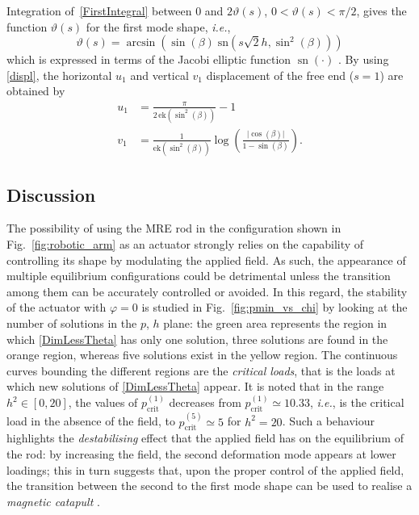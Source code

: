 \documentclass[oneside]{article}
\begin{document}
			Integration of~\eqref{FirstIntegral} between 0 and $2\vartheta(s)$, $0<\vartheta(s)<\pi/2$, gives the function $\vartheta(s)$ for the first mode shape, \textit{i.e.},
			\begin{equation}
			\vartheta(s) = \arcsin\left(\sin(\beta) \;\text{sn}(s \sqrt{2} h,\sin^2(\beta))\right)
			\end{equation}
			which is expressed in terms of the Jacobi elliptic function $\operatorname{sn}(\cdot)$ \cite{Byrd1971}. By using \eqref{displ}, the horizontal $u_1$ and vertical $v_1$ displacement of the free end ($s=1$) are obtained by
			\begin{align}
			u_1 &= \frac{\pi}{2\,\text{ek}(\sin^2(\beta))}-1\\
			v_1 &= \frac{1}{\text{ek}(\sin^2(\beta))}\log\!\left(\frac{\vert \cos(\beta)\vert}{1-\sin(\beta)}\right).
			\end{align}
			
			
			\subsection*{Discussion}
			
			The possibility of using the MRE rod in the configuration shown in Fig.~\ref{fig:robotic_arm} as an actuator strongly relies on the capability of controlling its shape by modulating the applied field. As such, the appearance of multiple equilibrium configurations could be detrimental unless the transition among them can be accurately controlled or avoided.
			In this regard, the stability of the actuator with $\varphi=0$ is studied in Fig.~\ref{fig:pmin_vs_chi} by looking at the number of solutions in the $p$, $h$ plane: the green area represents the region in which \eqref{DimLessTheta} has only one solution, three solutions are found in the orange region, whereas five solutions exist in the yellow region. The continuous curves bounding the different regions are the \emph{critical loads}, that is the loads at which new solutions of \eqref{DimLessTheta} appear. It is noted that in the range $h^2\in\left[0,20 \right]$, the values of $p_\text{crit}^{(1)}$ decreases from $p_\text{crit}^{(1)}\simeq 10.33$, \textit{i.e.}, is the critical load in the absence of the field, to $p_\text{crit}^{(5)}\simeq 5$ for $h^2=20$. Such a behaviour highlights the \emph{destabilising} effect that the applied field has on the equilibrium of the rod: by increasing the field, the second deformation mode appears at lower loadings; this in turn suggests that, upon the proper control of the applied field, the transition between the second to the first mode shape can be used to realise a \emph{magnetic catapult} \cite{Armanini2017}. 
			
\end{document}
